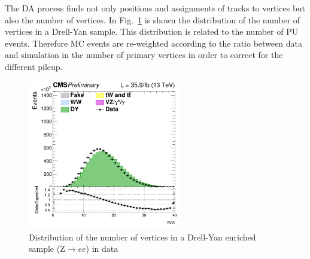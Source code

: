 The DA process finds not only positions and assignments of tracks to vertices but also the  number of vertices.
In Fig.~\ref{Fig:pu} is shown the distribution of the number of vertices in a Drell-Yan sample. This distribution is related to the number of PU events. Therefore MC events are re-weighted according to the ratio between data and simulation in the number of primary vertices in order to correct for the different pileup. 
\begin{figure}[htbp]
\centering
\includegraphics[width=0.6\textwidth]{../AN/Figs/nvertices.png}
\caption{
    Distribution of the number of vertices in a Drell-Yan enriched sample
    (Z$\rightarrow{}ee$) in
    data}
    \label{Fig:pu}
\end{figure}




